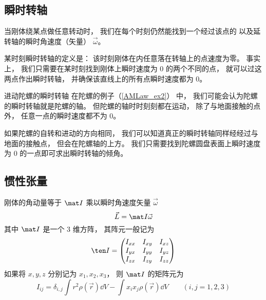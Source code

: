 

\subsection{瞬时转轴}
当刚体绕某点做任意转动时， 我们在每个时刻仍然能找到一个经过该点的 以及延转轴的瞬时角速度（矢量） $\vec \omega$。

某时刻瞬时转轴的定义是： 该时刻刚体在内任意落在转轴上的点速度为零。 事实上， 我们只需要在某时刻找到刚体上瞬时速度为 0 的两个不同的点， 就可以过这两点作出瞬时转轴， 并确保该直线上的所有点瞬时速度都为 0。

\begin{exam}{进动陀螺的瞬时转轴}
在陀螺的例子（\autoref{AMLaw_ex2}） 中， 我们可能会认为陀螺的瞬时转轴就是陀螺的轴。 但陀螺的轴时时刻刻都在运动， 除了与地面接触的点外， 任意一点的瞬时速度都不为 0。

如果陀螺的自转和进动的方向相同， 我们可以知道真正的瞬时转轴同样经经过与地面的接触点， 但会在陀螺轴的上方。 我们只需要找到陀螺圆盘表面上瞬时速度为 0 的一点即可求出瞬时转轴的倾角。
\end{exam}

\subsection{惯性张量}
刚体的角动量等于 $\mat I$ 乘以瞬时角速度矢量 $\vec \omega$
\begin{equation}
\vec L = \mat I \vec \omega
\end{equation}
其中 $\mat I$ 是一个 3 维方阵， 其阵元一般记为
\begin{equation}
\ten I = \begin{pmatrix}
I_{xx}& I_{xy}& I_{xz} \\
I_{yx}& I_{yy}& I_{yz} \\
I_{zx}& I_{zy}& I_{zz}
\end{pmatrix}
\end{equation}
如果将 $x, y, z$ 分别记为 $x_1, x_2, x_3$， 则 $\mat I$ 的矩阵元为
\begin{equation}
I_{ij} = \delta_{i, j} \int r^2 \rho(\vec r)\dd{V} - \int x_i x_j \rho(\vec r)\dd{V} \qquad (i, j = 1, 2, 3)
\end{equation}

